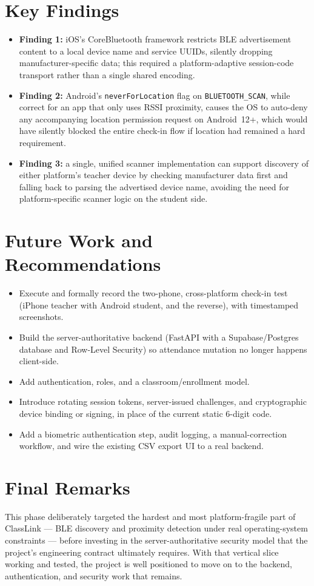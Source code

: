 \documentclass[12pt,a4paper]{report}
\begin{document}
\section{Key Findings}
\begin{itemize}
  \item \textbf{Finding 1:} iOS's CoreBluetooth framework restricts BLE advertisement content to a local device name and service UUIDs, silently dropping manufacturer-specific data; this required a platform-adaptive session-code transport rather than a single shared encoding.
  \item \textbf{Finding 2:} Android's \texttt{neverForLocation} flag on \texttt{BLUETOOTH\_SCAN}, while correct for an app that only uses RSSI proximity, causes the OS to auto-deny any accompanying location permission request on Android~12+, which would have silently blocked the entire check-in flow if location had remained a hard requirement.
  \item \textbf{Finding 3:} a single, unified scanner implementation can support discovery of either platform's teacher device by checking manufacturer data first and falling back to parsing the advertised device name, avoiding the need for platform-specific scanner logic on the student side.
\end{itemize}

\section{Future Work and Recommendations}
\begin{itemize}
  \item Execute and formally record the two-phone, cross-platform check-in test (iPhone teacher with Android student, and the reverse), with timestamped screenshots.
  \item Build the server-authoritative backend (FastAPI with a Supabase/Postgres database and Row-Level Security) so attendance mutation no longer happens client-side.
  \item Add authentication, roles, and a classroom/enrollment model.
  \item Introduce rotating session tokens, server-issued challenges, and cryptographic device binding or signing, in place of the current static 6-digit code.
  \item Add a biometric authentication step, audit logging, a manual-correction workflow, and wire the existing CSV export UI to a real backend.
\end{itemize}

\section{Final Remarks}
This phase deliberately targeted the hardest and most platform-fragile part of ClassLink --- BLE discovery and proximity detection under real operating-system constraints --- before investing in the server-authoritative security model that the project's engineering contract ultimately requires. With that vertical slice working and tested, the project is well positioned to move on to the backend, authentication, and security work that remains.
\end{document}
